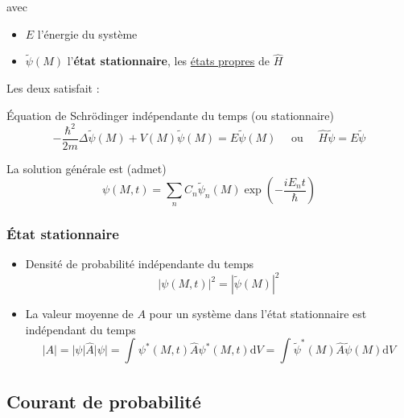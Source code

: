 avec
\begin{itemize}

    \item $E$ l'énergie du système 
    \item $\widetilde{\psi}(M)$ l'\textbf{état stationnaire}, les \underline{états propres} de $\hat{H}$

\end{itemize}

Les deux satisfait : 

\begin{Theorem}{Équation de Schrödinger indépendante du temps (ou stationnaire)}{}
\begin{equation}
  - \frac{\hbar ^{2}}{2m} \Delta \widetilde{\psi}(M) + V(M) \widetilde{\psi}(M) = E  \widetilde{\psi}(M) \quad\text{ ou } \quad \hat{H} \widetilde{\psi} = E \widetilde{\psi}
\end{equation}
\end{Theorem}

La solution générale est (admet)
\begin{equation}
  \psi(M,t) = \sum_{n}^{}C_n \widetilde{\psi}_n(M) \exp \left( - \frac{iE_nt}{\hbar}  \right)
\end{equation}

\subsubsection{État stationnaire} %
\label{sub:État stationnaire}

\begin{itemize}

    \item Densité de probabilité indépendante du temps 
      \begin{equation}
        | \psi(M,t) | ^{2} = | \widetilde \psi(M) | ^{2}
      \end{equation}

    \item La valeur moyenne de $A$ pour un système dans l'état stationnaire est indépendant du temps 
      \begin{equation}
        | A | = | \psi | \hat{A} | \psi | = \int_{}^{} \psi ^{*}(M,t) \hat{A} \psi ^{*}(M,t) \mathrm{d}V = \int_{}^{} \widetilde{\psi} ^{*}(M) \hat{A} \widetilde{\psi}(M) \mathrm{d}V
      \end{equation}

\end{itemize}


\subsection{Courant de probabilité} %
\label{sec:Courant de probabilité}


